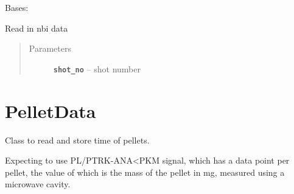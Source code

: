 \documentclass[letterpaper,10pt,english]{sphinxmanual}
\begin{document}
\begin{fulllineitems}
\label{nbi_data:nbi_data.NBIData}
Bases: 

\begin{fulllineitems}
\label{nbi_data:nbi_data.NBIData.NBI_MIN_POWER}
\end{fulllineitems}


\begin{fulllineitems}
\label{nbi_data:nbi_data.NBIData.read_data}
Read in nbi data
\begin{quote}\begin{description}
\item[{Parameters}] \leavevmode
\textbf{\texttt{shot\_no}} -- shot number

\end{description}\end{quote}

\end{fulllineitems}


\end{fulllineitems}



\section{PelletData}
\label{pellet_data:pelletdata}\label{pellet_data:module-pellet_data}\label{pellet_data::doc}
Class to read and store time of pellets.

Expecting to use PL/PTRK-ANA\textless{}PKM signal, which has a data point
per pellet, the value of which is the mass of the pellet in mg,
measured using a microwave cavity.
\end{document}
